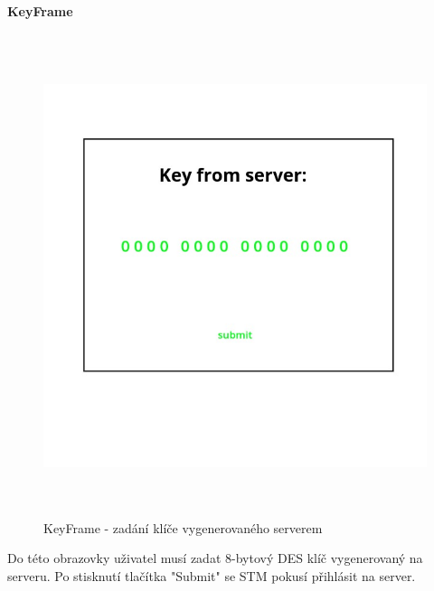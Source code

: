\paragraph{KeyFrame}
\begin{figure}[H]\centering
\includegraphics[width=140mm, height=140mm]{../img/key_frame.jpg}
\caption{KeyFrame - zadání klíče vygenerovaného serverem}
\label{key-frame}
\end{figure}

Do této obrazovky uživatel musí zadat 8-bytový DES klíč vygenerovaný na serveru.
Po stisknutí tlačítka "Submit" se STM pokusí přihlásit na server.

